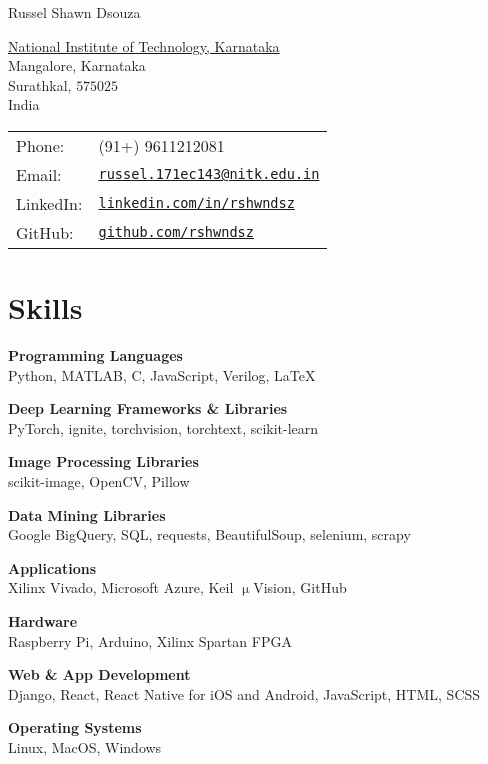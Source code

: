 \documentclass[letterpaper]{article}
\def\name{Russel Shawn Dsouza}
\renewenvironment{itemize}{
  \begin{list}{}{
    \setlength{\leftmargin}{1.5em}
  }
}{
  \end{list}
}
\begin{document}
{\huge \name}


\vspace{0.25in}

\begin{minipage}{0.45\linewidth}
  \href{http://www.nitk.ac.in/}{National Institute of Technology, Karnataka} \\
  Mangalore, Karnataka \\
  Surathkal, $575025$\\
  India
\end{minipage}
\hfill
\begin{minipage}{0.45\linewidth}
  \begin{tabular}{ll}
    Phone: & (91+) 9611212081 \\
    Email: & \href{mailto:russel.171ec143@nitk.edu.in}{\tt russel.171ec143@nitk.edu.in} \\
    LinkedIn: & \href{https://www.linkedin.com/in/rshwndsz}{\tt linkedin.com/in/rshwndsz} \\
    GitHub: & \href{https://www.github.com/rshwndsz}{\tt github.com/rshwndsz}
  \end{tabular}
\end{minipage}

\section*{Skills}
  \begin{itemize}
    \item \textbf{Programming Languages}\\ 
    Python, MATLAB, C, JavaScript, Verilog, \LaTeX
    \item \textbf{Deep Learning Frameworks \& Libraries}\\ 
    PyTorch, ignite, torchvision, torchtext, scikit-learn
    \item \textbf{Image Processing Libraries}\\
    scikit-image, OpenCV, Pillow
    \item \textbf{Data Mining Libraries}\\
    Google BigQuery, SQL, requests, BeautifulSoup, selenium, scrapy
    \item \textbf{Applications}\\
    Xilinx Vivado, Microsoft Azure, Keil $\upmu$Vision, GitHub
    \item \textbf{Hardware}\\
    Raspberry Pi, Arduino, Xilinx Spartan FPGA
    \item \textbf{Web \& App Development}\\
    Django, React, React Native for iOS and Android, JavaScript, HTML, SCSS
    \item \textbf{Operating Systems}\\
    Linux, MacOS, Windows
  \end{itemize}
\end{document}
